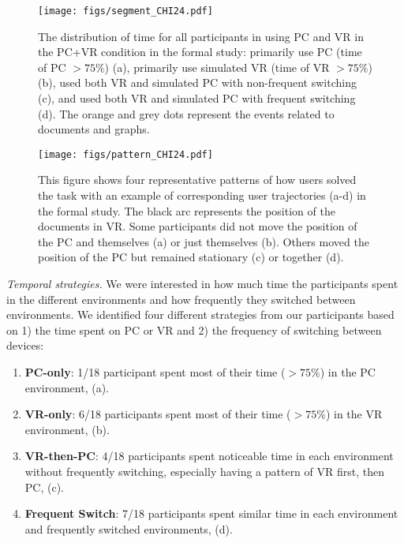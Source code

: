 \begin{figure}
\centering
\texttt{[image: figs/segment\_CHI24.pdf]}
\caption{The distribution of time for all participants in using PC and VR in the PC+VR condition in the formal study: primarily use PC (time of PC ${>} 75\%$) (a), primarily use simulated VR (time of VR ${>} 75\%$) (b), used both VR and simulated PC with non-frequent switching (c), and used both VR and simulated PC with frequent switching (d). The orange and grey dots represent the events related to documents and graphs.}
\label{fig:time}
\end{figure}

\begin{figure*}
\centering
\texttt{[image: figs/pattern\_CHI24.pdf]}
\caption{This figure shows four representative patterns of how users solved the task with an example of corresponding user trajectories (a-d) in the formal study. The black arc represents the position of the documents in VR. Some participants did not move the position of the PC and themselves (a) or just themselves (b). Others moved the position of the PC but remained stationary (c) or together (d).}
\label{fig:patterns}
\end{figure*}

\vspace{1mm}\noindent\textit{Temporal strategies.}
We were interested in how much time the participants spent in the different environments and how frequently they switched between environments. 
We identified four different strategies from our participants based on 1) the time spent on PC or VR and 2) the frequency of switching between devices:
\begin{enumerate}[noitemsep,topsep=0pt,parsep=0pt,partopsep=0pt,leftmargin=*]
    \item \textbf{PC-only}: 1/18 participant spent most of their time (${>} 75\%$) in the PC environment, (a).
    \item \textbf{VR-only}: 6/18 participants spent most of their time (${>} 75\%$) in the VR environment, (b).
    \item \textbf{VR-then-PC}: 4/18 participants spent noticeable time in each environment without frequently switching, especially having a pattern of VR first, then PC, (c).
    \item \textbf{Frequent Switch}: 7/18 participants spent similar time in each environment and frequently switched environments, (d).
\end{enumerate}

